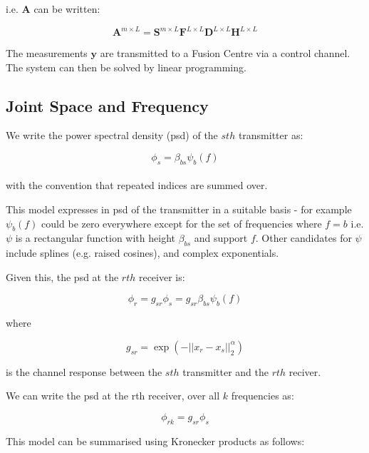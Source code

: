 \documentclass[titlepage]{article}
\begin{document}
i.e. \(\textbf{A}\) can be written: 

\begin{equation}
\textbf{A}^{m\times L} = \textbf{S}^{m\times L} \textbf{F}^{L\times L} \textbf{D}^{L \times L} \textbf{H}^{L \times L}
\label{system}
\end{equation}

The measurements \(\textbf{y}\) are transmitted to a Fusion Centre via a control channel. The system can then be solved by linear programming.

\subsection{Joint Space and Frequency}
We write the power spectral density (psd) of the \(sth\) transmitter as:

\begin{equation}
\phi_s = \beta_{bs} \psi_b\left(f\right)
\label{basis_expansion}
\end{equation}
\\
with the convention that repeated indices are summed over. 

This model expresses in psd of the transmitter in a suitable basis - for example \(\psi_b\left(f\right)\) could be zero everywhere except for the set of frequencies where \(f=b\) i.e. \(\psi\) is a rectangular function with height \(\beta_{bs}\) and support \(f\). Other candidates for \(\psi\) include splines (e.g. raised cosines), and complex exponentials. 

Given this, the psd at the \(rth\) receiver is:

\begin{equation}
\phi_r = g_{sr}\phi_s = g_{sr}\beta_{bs}\psi_b\left(f\right)
\end{equation}

where

\begin{equation}
g_{sr} = \exp\left(-||x_r - x_s||_2^\alpha\right)
\end{equation}

is the channel response between the \(sth\) transmitter and the \(rth\) reciver.

We can write the psd at the rth receiver, over all \(k\) frequencies as:

\begin{equation}
\phi_{rk} = g_{sr}\phi_s 
\end{equation}

This model can be summarised using Kronecker products as follows:
\end{document}
